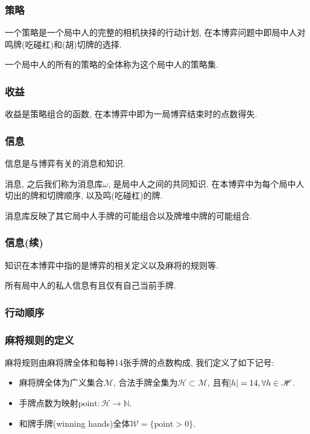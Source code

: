 \documentclass{ctexbeamer}
\renewenvironment{note}[1][\empty]
    {\block{注(#1)}}
    {\endblock}
\newcommand{\mahjong}{\mathscr{M}}
\newcommand{\point}{\mathrm{point}}
\newcommand{\Hand}{\mathscr{H}}
\newcommand{\hand}{h}
\newcommand{\base}{\omega}
\begin{document}
	\begin{frame}
		\frametitle{策略}
		\begin{definition}[策略]
			一个策略是一个局中人的完整的相机抉择的行动计划,
			在本博弈问题中即局中人对鸣牌(吃碰杠)和(胡)切牌的选择.
		\end{definition}
		\begin{definition}[策略集]
			一个局中人的所有的策略的全体称为这个局中人的策略集.
		\end{definition}
	\end{frame}

	\begin{frame}
		\frametitle{收益}
		\begin{definition}[收益]
			收益是策略组合的函数, 在本博弈中即为一局博弈结束时的点数得失.
		\end{definition}
	\end{frame}

	\begin{frame}
		\frametitle{信息}
		\begin{definition}[信息]
			信息是与博弈有关的消息和知识.
		\end{definition}
		\begin{definition}[消息]
			消息, 之后我们称为消息库$\base$, 是局中人之间的共同知识.
			在本博弈中为每个局中人切出的牌和切牌顺序, 以及鸣(吃碰杠)的牌.
		\end{definition}
		\begin{note}[消息库]
			消息库反映了其它局中人手牌的可能组合以及牌堆中牌的可能组合.
		\end{note}
	\end{frame}

	\begin{frame}
		\frametitle{信息(续)}
		\begin{definition}[知识]
			知识在本博弈中指的是博弈的相关定义以及麻将的规则等.
		\end{definition}
		\begin{note}[私人信息]
			所有局中人的私人信息有且仅有自己当前手牌.
		\end{note}
	\end{frame}
	
	\begin{frame}
		\frametitle{行动顺序}

	\end{frame}

	\begin{frame}
		\frametitle{麻将规则的定义}
		\begin{definition}[麻将规则]
			麻将规则由麻将牌全体和每种14张手牌的点数构成, 我们定义了如下记号:
			\begin{itemize}
				\item 麻将牌全体为广义集合$\mahjong$,
					合法手牌全集为$\Hand\subset\mahjong$,
					且有$\abs{\hand}=14, \forall{\hand\in\Hand}$.
				\item 手牌点数为映射$\point: \Hand\rightarrow\mathbb{N}$.
				\item 和牌手牌(winning hands)全体$\mathscr{W}=\{\point>0\}$.
			\end{itemize}
		\end{definition}
	\end{frame}
\end{document}
